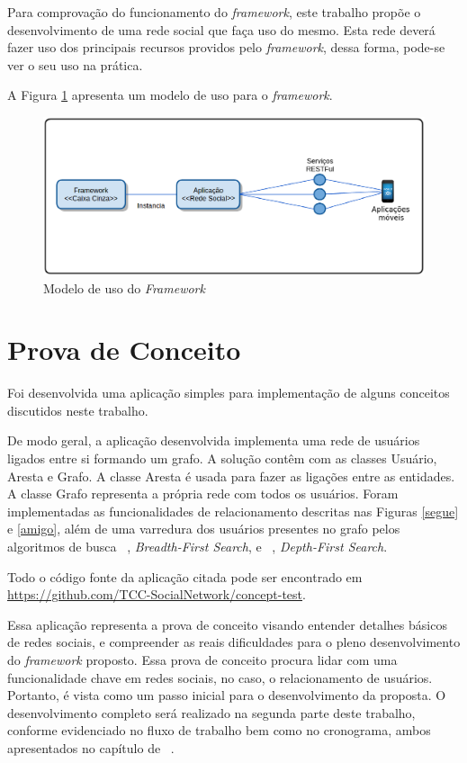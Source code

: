 Para comprovação do funcionamento do \textit{framework}, este trabalho propõe o desenvolvimento de uma rede social que faça uso do mesmo. Esta rede deverá fazer uso dos principais recursos providos pelo \textit{framework}, dessa forma, pode-se ver o seu uso na prática.

A Figura \ref{uso_proposto} apresenta um modelo de uso para o \textit{framework}.

\begin{figure}[!h]
	\centering
	\includegraphics[scale=0.45]{figuras/capitulo5/uso_proposto.eps}
	\caption{Modelo de uso do \textit{Framework}}
	\label{uso_proposto}
\end{figure}

\section{Prova de Conceito}

Foi desenvolvida uma aplicação simples para implementação de alguns conceitos discutidos neste trabalho.

De modo geral, a aplicação desenvolvida implementa uma rede de usuários ligados entre si formando um grafo. A solução contêm com as classes Usuário, Aresta e Grafo. A classe Aresta é usada para fazer as ligações entre as entidades. A classe Grafo representa a própria rede com todos os usuários. Foram implementadas as funcionalidades de relacionamento descritas nas Figuras \ref{segue} e \ref{amigo}, além de uma varredura dos usuários presentes no grafo pelos algoritmos de busca ~, \textit{Breadth-First Search}, e ~, \textit{Depth-First Search}.

Todo o código fonte da aplicação citada pode ser encontrado em \url{https://github.com/TCC-SocialNetwork/concept-test}.

Essa aplicação representa a prova de conceito visando entender detalhes básicos de redes sociais, e compreender as reais dificuldades para o pleno desenvolvimento do \textit{framework} proposto. Essa prova de conceito procura lidar com uma funcionalidade chave em redes sociais, no caso, o relacionamento de usuários. Portanto, é vista como um passo inicial para o desenvolvimento da proposta. O desenvolvimento completo será realizado na segunda parte deste trabalho, conforme evidenciado no fluxo de trabalho bem como no cronograma, ambos apresentados no capítulo de ~.

